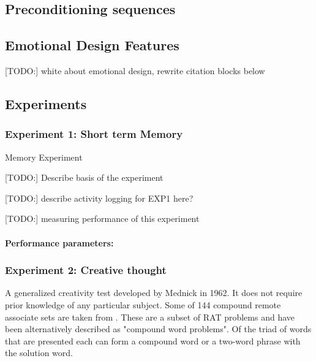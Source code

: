 	\subsection{Preconditioning sequences} \label{preconditioning}
	
	
	
	\subsection{Emotional Design Features}
	
	[TODO:] white about emotional design, rewrite citation blocks below
	
	
	\subsection{Experiments}

		\subsubsection{Experiment 1: Short term Memory}
		
		Memory Experiment 
		
		[TODO:] Describe basis of the experiment
		
		[TODO:] describe activity logging for EXP1 here?
		
		[TODO:] measuring performance of this experiment
		
		\paragraph{Performance parameters:} \label{sec:memory-parameters}
		
		\subsubsection{Experiment 2: Creative thought}
		
		A generalized creativity test developed by Mednick \cite{Mednick1962} in 1962. It does not require prior knowledge of any particular subject. Some of 144 compound remote associate sets are taken from \cite{Bowden}. These are a subset of RAT problems and have been alternatively described as "compound word problems". Of the triad of words that are presented each can form a compound word or a two-word phrase with the solution word.
		
